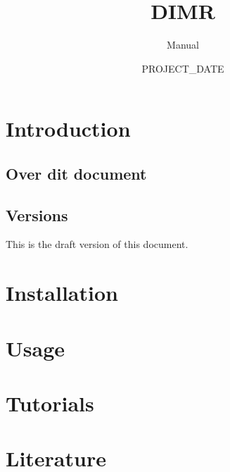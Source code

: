 \documentclass[signature]{deltares_manual}
\begin{document}
\pagestyle{empty}
\cleardoublepage
%
\newcommand{\ProgramName}{DIMR\xspace}

\title{\ProgramName}
\subtitle{Manual}
\projectnumber{}
\classification{-}

\date{PROJECT_DATE}



\summary{}

\authori{}
\revieweri{}
\approvali{}





\chapter{Introduction} 
\label{chapterIntroduction}

\section{Over dit document} \label{sec:PurposeAndScope}

\section{Versions}
\label{sec:Versions}
This is the draft version of this document.

\chapter{Installation}
\label{sec:Installation}

\chapter{Usage}
\label{sec:usage}

\chapter{Tutorials}
\label{sec:Tutorials}


\chapter{Literature}  \label{chapterLiterature}




\pagestyle{empty}
\mbox{}

\end{document}
